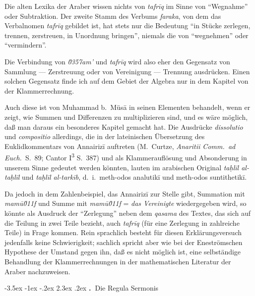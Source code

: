 \documentclass[11pt,a4paper]{article}
\makeatletter
\newcommand{\begingreek}{\bgroup\greekfont}
\newcommand{\closegreek}{\egroup}
\renewcommand{\section}{\@startsection{section}{1}{\z@}%
  {-3.5ex \@plus -1ex \@minus -.2ex}%
  {2.3ex \@plus .2ex}%
  {\normalfont\Large\bfseries\color{sectioncolor}\thesection.\ }}
\newcommand{\enquote}[1]{``#1''}
\makeatother
\begin{document}
Die alten Lexika der Araber wissen nichts von \textit{tafr\={i}q} im Sinne von \enquote{Wegnahme} oder Subtraktion. Der zweite Stamm des Verbums \textit{faraka}, von dem das Verbalnomen \textit{tafr\={i}q} gebildet ist, hat stets nur die Bedeutung \enquote{in St\"ucke zerlegen, trennen, zerstreuen, in Unordnung bringen}, niemals die von \enquote{wegnehmen} oder \enquote{vermindern}.

Die Verbindung von \textit{\u0357{}am'} und \textit{tafr\={i}q} wird also eher den Gegensatz von Sammlung --- Zerstreuung oder von Vereinigung --- Trennung ausdr\"ucken. Einen solchen Gegensatz finde ich auf dem Gebiet der Algebra nur in dem Kapitel von der Klammerrechnung.

Auch diese ist von Muhammad b.\ M\"us\=a in seinen Elementen behandelt, wenn er zeigt, wie Summen und Differenzen zu multiplizieren sind, und es w\"are m\"oglich, da\ss{} man daraus ein besonderes Kapitel gemacht hat. Die Ausdr\"ucke \textit{dissolutio} und \textit{compositio} allerdings, die in der lateinischen \"Ubersetzung des Euklidkommentars von Annairiz\=i{} auftreten (M.\ Curtze, \textit{Anaritii Comm.\ ad Euch.}\ S.\ 89; Cantor I\textsuperscript{3} S.\ 387) und als Klammeraufl\"osung und Absonderung in unserem Sinne gedeutet werden k\"onnten, lauten im arabischen Original \textit{ta\d{h}l\={i}l al-ta\d{h}l\={i}l} und \textit{ta\d{h}l\={i}l al-tark\={i}b}, d.\ i.\ \begingreek meth-odos analutik\=i \closegreek und \begingreek meth-odos suntithetik\=i.\closegreek

Da jedoch in dem Zahlenbeispiel, das Annairiz\=i{} zur Stelle gibt, Summation mit \textit{mam\=u\u011f} und Summe mit \textit{mam\=u\u011f} = \textit{das Vereinigte} wiedergegeben wird, so k\"onnte als Ausdruck der \enquote{Zerlegung} neben dem \textit{qasama} des Textes, das sich auf die Teilung in zwei Teile bezieht, auch \textit{tafr\={i}q} (f\"ur eine Zerlegung in zahlreiche Teile) in Frage kommen. Rein sprachlich besteht f\"ur diesen Erkl\"arungsversuch jedenfalls keine Schwierigkeit; sachlich spricht aber wie bei der Enestr\"omschen Hypothese der Umstand gegen ihn, da\ss{} es nicht m\"oglich ist, eine selbst\"andige Behandlung der Klammerrechnungen in der mathematischen Literatur der Araber nachzuweisen.

\clearpage

\section{Die Regula Sermonis}
\end{document}

